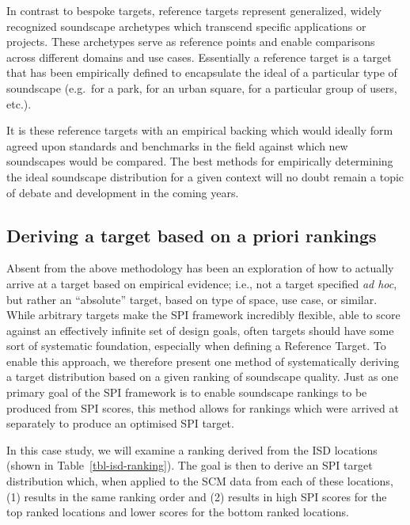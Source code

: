 \documentclass[
  authoryear,
  preprint,
  3p]{elsarticle}
\begin{document}
In contrast to bespoke targets, reference targets represent generalized,
widely recognized soundscape archetypes which transcend specific
applications or projects. These archetypes serve as reference points and
enable comparisons across different domains and use cases. Essentially a
reference target is a target that has been empirically defined to
encapsulate the ideal of a particular type of soundscape (e.g.~for a
park, for an urban square, for a particular group of users, etc.).

It is these reference targets with an empirical backing which would
ideally form agreed upon standards and benchmarks in the field against
which new soundscapes would be compared. The best methods for
empirically determining the ideal soundscape distribution for a given
context will no doubt remain a topic of debate and development in the
coming years.

\subsection{Deriving a target based on a priori
rankings}\label{sec-targets}

Absent from the above methodology has been an exploration of how to
actually arrive at a target based on empirical evidence; i.e., not a
target specified \emph{ad hoc}, but rather an ``absolute'' target, based
on type of space, use case, or similar. While arbitrary targets make the
SPI framework incredibly flexible, able to score against an effectively
infinite set of design goals, often targets should have some sort of
systematic foundation, especially when defining a Reference Target. To
enable this approach, we therefore present one method of systematically
deriving a target distribution based on a given ranking of soundscape
quality. Just as one primary goal of the SPI framework is to enable
soundscape rankings to be produced from SPI scores, this method allows
for rankings which were arrived at separately to produce an optimised
SPI target.

In this case study, we will examine a ranking derived from the ISD
locations (shown in Table~\ref{tbl-isd-ranking}). The goal is then to
derive an SPI target distribution which, when applied to the SCM data
from each of these locations, (1) results in the same ranking order and
(2) results in high SPI scores for the top ranked locations and lower
scores for the bottom ranked locations.
\end{document}
